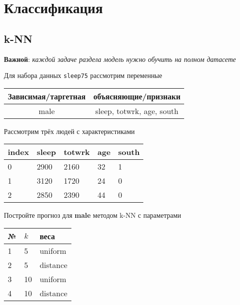 
\section{Классификация}

\subsection{k-NN}

\textbf{Важной}: \textit{каждой задаче раздела модель нужно обучить на полном датасете}

\begin{exercise}
Для набора данных \texttt{sleep75} рассмотрим переменные
\begin{center}
	\begin{tabular}{|c|c|} \hline
		Зависимая/таргетная & объясняющие/признаки \\ \hline
		male & sleep, totwrk, age, south \\ \hline
	\end{tabular}
\end{center}
Рассмотрим трёх людей с характеристиками
\begin{center}
	\begin{tabular}{|l||l|l|l|l|}\hline
		index & sleep & totwrk & age & south  \\ \hline\hline
		0 & 2900 & 2160 & 32 & 1  \\
		1 & 3120 & 1720 & 24 & 0  \\
		2 & 2850 & 2390 & 44 & 0  \\ \hline
	\end{tabular}
\end{center}
Постройте прогноз для \textbf{male} методом k-NN с параметрами
\begin{center}
	\begin{tabular}{|l|l|l|}\hline
	№ & \(k\) & веса \\ \hline
	1 & 5 & uniform \\
	2 & 5 & distance \\
	3 & 10 & uniform \\
	4 & 10 & distance \\ \hline
	\end{tabular}
\end{center}
\end{exercise}

